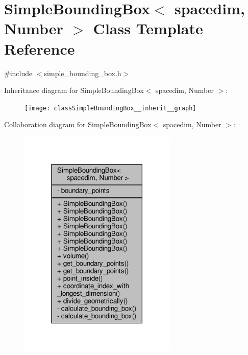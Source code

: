 \hypertarget{classSimpleBoundingBox}{}\section{Simple\+Bounding\+Box$<$ spacedim, Number $>$ Class Template Reference}
\label{classSimpleBoundingBox}


{\ttfamily \#include $<$simple\+\_\+bounding\+\_\+box.\+h$>$}



Inheritance diagram for Simple\+Bounding\+Box$<$ spacedim, Number $>$\+:\nopagebreak
\begin{figure}[H]
\begin{center}
\leavevmode
\texttt{[image: classSimpleBoundingBox\_\_inherit\_\_graph]}
\end{center}
\end{figure}


Collaboration diagram for Simple\+Bounding\+Box$<$ spacedim, Number $>$\+:\nopagebreak
\begin{figure}[H]
\begin{center}
\leavevmode
\includegraphics[width=213pt]{classSimpleBoundingBox__coll__graph}
\end{center}
\end{figure}
